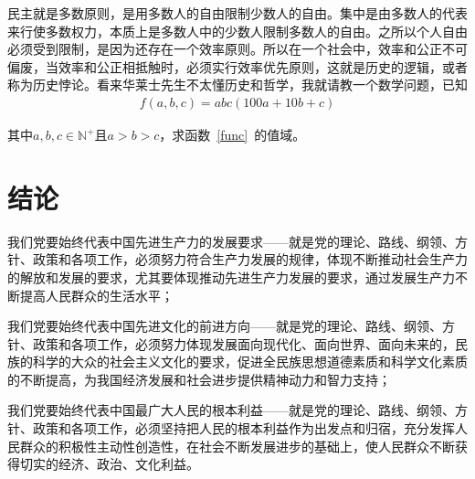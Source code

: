 民主就是多数原则，是用多数人的自由限制少数人的自由。集中是由多数人的代表来行使多数权力，本质上是多数人中的少数人限制多数人的自由。之所以个人自由必须受到限制，是因为还存在一个效率原则。所以在一个社会中，效率和公正不可偏废，当效率和公正相抵触时，必须实行效率优先原则，这就是历史的逻辑，或者称为历史悖论。看来华莱士先生不太懂历史和哲学，我就请教一个数学问题，已知
\begin{align}
	f(a,b,c)=abc(100a+10b+c)\label{func}
\end{align}

其中\(a,b,c\in \mathbb{N}^+\)且\(a>b>c\)，求函数~\eqref{func}~的值域。

	


\chapter{结论}
我们党要始终代表中国先进生产力的发展要求——就是党的理论、路线、纲领、方针、政策和各项工作，必须努力符合生产力发展的规律，体现不断推动社会生产力的解放和发展的要求，尤其要体现推动先进生产力发展的要求，通过发展生产力不断提高人民群众的生活水平；

我们党要始终代表中国先进文化的前进方向——就是党的理论、路线、纲领、方针、政策和各项工作，必须努力体现发展面向现代化、面向世界、面向未来的，民族的科学的大众的社会主义文化的要求，促进全民族思想道德素质和科学文化素质的不断提高，为我国经济发展和社会进步提供精神动力和智力支持；

我们党要始终代表中国最广大人民的根本利益——就是党的理论、路线、纲领、方针、政策和各项工作，必须坚持把人民的根本利益作为出发点和归宿，充分发挥人民群众的积极性主动性创造性，在社会不断发展进步的基础上，使人民群众不断获得切实的经济、政治、文化利益。